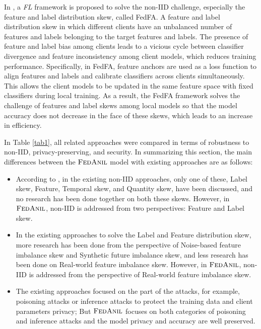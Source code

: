 In \citep{ref64}, a \emph{FL} framework is proposed to solve the non-IID challenge, especially the feature and label distribution skew, called FedFA. A feature and label distribution skew in which different clients have an unbalanced number of features and labels belonging to the target features and labels. The presence of feature and label bias among clients leads to a vicious cycle between classifier divergence and feature inconsistency among client models, which reduces training performance. Specifically, in FedFA, feature anchors are used as a loss function to align features and labels and calibrate classifiers across clients simultaneously. This allows the client models to be updated in the same feature space with fixed classifiers during local training. As a result, the FedFA framework solves the challenge of features and label skews among local models so that the model accuracy does not decrease in the face of these skews, which leads to an increase in efficiency.

In Table \ref{tab1}, all related approaches were compared in terms of robustness to non-IID, privacy-preserving, and security. In summarizing this section, the main differences between the $\textsc{FedAnil}$ model with existing approaches are as follows:

\vspace{-\topsep}
\begin{itemize}
  \setlength{\parskip}{0pt}
  \setlength{\itemsep}{0pt plus 1pt}
	\item According to \citep{ref15}, in the existing non-IID approaches, only one of these, Label skew, Feature, Temporal skew, and Quantity skew, have been discussed, and no research has been done together on both these skews. However, in $\textsc{FedAnil}$, non-IID is addressed from two perspectives: Feature and Label skew.
	\item In the existing approaches to solve the Label and Feature distribution skew, more research has been done from the perspective of Noise-based feature imbalance skew and Synthetic future imbalance skew, and less research has been done on Real-world feature imbalance skew. However, in $\textsc{FedAnil}$, non-IID is addressed from the perspective of Real-world feature imbalance skew.
	\item The existing approaches focused on the part of the attacks, for example, poisoning attacks or inference attacks to protect the training data and client parameters privacy; But {$\textsc{FedAnil}$} focuses on both categories of poisoning and inference attacks and the model privacy and accuracy are well preserved.
\end{itemize}
\vspace{-\topsep}

